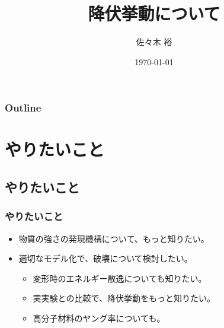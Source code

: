 \documentclass[10pt, dvipdfmx]{beamer}
\title{降伏挙動について}
\author[東亞合成　佐々木]{佐々木 裕}
\institute[東亞合成]{東亞合成株式会社}
\date{\today}
\begin{document}
\maketitle

\begin{frame}
\frametitle{Outline}
\tableofcontents
\end{frame}

\section{やりたいこと}

\subsection{やりたいこと}

\begin{frame}
	\frametitle{やりたいこと}
	\Large
	\begin{itemize}
		\item 物質の強さの発現機構について、もっと知りたい。
		\item 適切なモデル化で、破壊について検討したい。
		\begin{itemize}
			\item 変形時のエネルギー散逸についても知りたい。
			\item 実実験との比較で、降伏挙動をもっと知りたい。
			\item 高分子材料のヤング率についても。
		\end{itemize}
	\end{itemize}
\end{frame}

\end{document}
